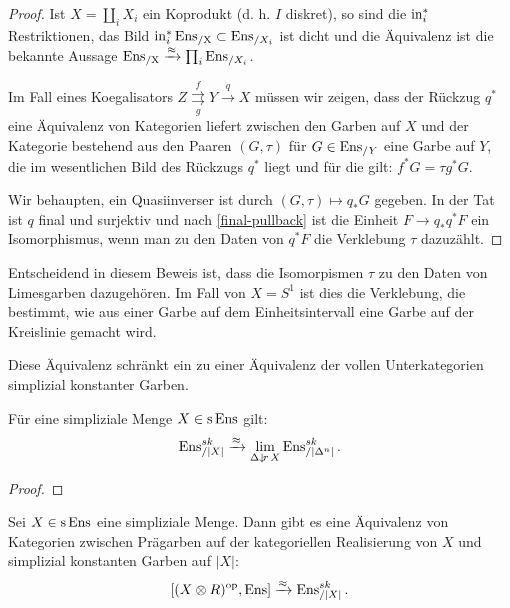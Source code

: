 \begin{proof}
  
  Ist $X = \coprod_i X_i$ ein Koprodukt (d. h. $I$ diskret), so sind
  die $\operatorname{in}_i^*$ Restriktionen, das Bild $\operatorname{in}_i^* \operatorname{Ens_{/X}} \subset
  \operatorname{Ens}_{/X_i}$ ist dicht und die Äquivalenz ist die bekannte Aussage
  $\operatorname{Ens_{/X}} \xrightarrow{\approx} \prod_i \operatorname{Ens}_{/X_i}$.

  Im Fall eines Koegalisators $Z
  \overset{f}{\underset{g}{\rightrightarrows}} Y \xrightarrow{q} X$
  müssen wir zeigen, dass der Rückzug $q^*$ eine Äquivalenz von
  Kategorien liefert zwischen den Garben auf $X$ und der Kategorie
  bestehend aus den Paaren $(G, \tau)$ für $G \in \operatorname{Ens}_{/Y}$ eine
  Garbe auf $Y$, die im wesentlichen Bild des Rückzugs $q^*$ liegt und
  für die gilt: $f^* G = \tau g^* G$.

  Wir behaupten, ein Quasiinverser ist durch $(G, \tau) \mapsto q_* G$
  gegeben. In der Tat ist $q$ final und surjektiv und nach
  \ref{final-pullback} ist die Einheit $F \to q_* q^* F$ ein
  Isomorphismus, wenn man zu den Daten von $q^* F$ die Verklebung
  $\tau$ dazuzählt.
\end{proof}
\begin{bem}
  Entscheidend in diesem Beweis ist, dass die Isomorpismen $\tau$ zu
  den Daten von Limesgarben dazugehören. Im Fall von $X = S^1$ ist
  dies die Verklebung, die bestimmt, wie aus einer Garbe auf dem
  Einheitsintervall eine Garbe auf der Kreislinie gemacht wird.
\end{bem}
Diese Äquivalenz schränkt ein zu einer Äquivalenz der vollen
Unterkategorien simplizial konstanter Garben.
\begin{prop}
 Für eine simpliziale Menge $X \in \operatorname{s}\operatorname{Ens}$ gilt:
  \[ \operatorname{Ens}_{/|X|}^{sk} \xrightarrow{\approx} \lim_{\Delta \downarrow \! {\scriptstyle r} \, X} \operatorname{Ens}_{/|\Delta^n|}^{sk}. \]
\end{prop}
\begin{proof}
\end{proof}
\begin{theorem}
  Sei $X \in \operatorname{s}\operatorname{Ens}$ eine simpliziale Menge. Dann gibt es eine
  Äquivalenz von Kategorien zwischen Prägarben auf der kategoriellen
  Realisierung von $X$ und simplizial konstanten Garben auf $|X|$:
  \[ [(X \otimes R)^\mathrm{op}, \operatorname{Ens}] \xrightarrow{\approx} \operatorname{Ens}^{sk}_{/|X|} .\]
\end{theorem}
